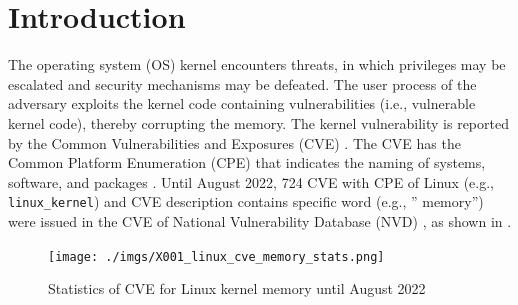 \section{Introduction}\label{seciton:introduction}
%
The operating system (OS) kernel encounters threats, in which privileges may be
escalated and security mechanisms may be defeated.
The user process of the adversary exploits the kernel code containing
vulnerabilities (i.e., vulnerable kernel code), thereby corrupting the memory.
%
The kernel vulnerability is reported by the Common Vulnerabilities and Exposures
(CVE) \cite{cve}. The CVE has the Common Platform Enumeration (CPE) that indicates the naming of
systems, software, and packages \cite{cpe}.
%
Until August 2022, 724 CVE with CPE of Linux (e.g., \verb|linux_kernel|) and CVE
description contains specific word (e.g., '' memory'') were issued in the CVE of
National Vulnerability Database (NVD) \cite{nvd}, as shown in
.

\begin{figure}[tb]
    \hspace{-5ex}
        \begin{center}
          \texttt{[image: ./imgs/X001\_linux\_cve\_memory\_stats.png]}
        \end{center}
        \caption{
          Statistics of CVE for Linux kernel memory until August 2022 \cite{nvd}
        }
        \label{fig:linux_memory_cve}
\end{figure}

